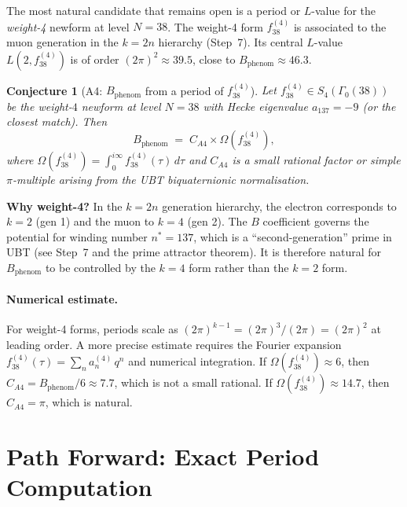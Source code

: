 \documentclass[12pt,a4paper]{article}
\newtheorem{conjecture}[theorem]{Conjecture}
\theoremstyle{definition}
\theoremstyle{remark}
\begin{document}
The most natural candidate that remains open is a period or $L$-value for the
\emph{weight-4} newform at level $N = 38$.  The weight-4 form $f_{38}^{(4)}$
is associated to the muon generation in the $k = 2n$ hierarchy (Step~7).
Its central $L$-value $L(2, f_{38}^{(4)})$ is of order $(2\pi)^2 \approx 39.5$,
close to $B_{\mathrm{phenom}} \approx 46.3$.

\begin{conjecture}[A4: $B_{\mathrm{phenom}}$ from a period of $f_{38}^{(4)}$]
\label{conj:A4}
Let $f_{38}^{(4)} \in S_4(\Gamma_0(38))$ be the weight-$4$ newform at level
$N = 38$ with Hecke eigenvalue $a_{137} = -9$ (or the closest match).  Then
\begin{equation}
  B_{\mathrm{phenom}}
  \;=\; C_{A4} \times \Omega\!\left(f_{38}^{(4)}\right),
  \label{eq:conj_A4}
\end{equation}
where $\Omega(f_{38}^{(4)}) = \int_0^{i\infty} f_{38}^{(4)}(\tau)\,d\tau$
and $C_{A4}$ is a small rational factor or simple $\pi$-multiple arising from
the UBT biquaternionic normalisation.
\end{conjecture}

\begin{insightbox}
\textbf{Why weight-4?}  In the $k = 2n$ generation hierarchy, the electron
corresponds to $k = 2$ (gen 1) and the muon to $k = 4$ (gen 2).  The $B$
coefficient governs the potential for winding number $n^* = 137$, which is a
``second-generation'' prime in UBT (see Step~7 and the prime attractor
theorem).  It is therefore natural for $B_{\mathrm{phenom}}$ to be controlled
by the $k = 4$ form rather than the $k = 2$ form.
\end{insightbox}

\paragraph{Numerical estimate.}
For weight-4 forms, periods scale as $(2\pi)^{k-1} = (2\pi)^3 / (2\pi) = (2\pi)^2$
at leading order.  A more precise estimate requires the Fourier expansion
$f_{38}^{(4)}(\tau) = \sum_n a_n^{(4)}\,q^n$ and numerical integration.  If
$\Omega(f_{38}^{(4)}) \approx 6$, then $C_{A4} = B_{\mathrm{phenom}} / 6
\approx 7.7$, which is not a small rational.  If $\Omega(f_{38}^{(4)}) \approx
14.7$, then $C_{A4} = \pi$, which is natural.

\section{Path Forward: Exact Period Computation}
\label{sec:path_forward}
\end{document}

